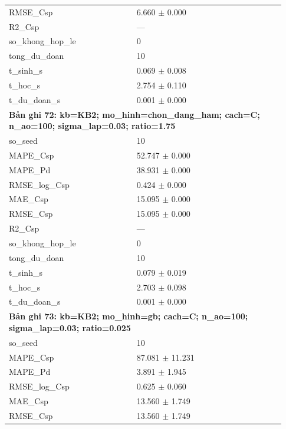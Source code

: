 \begin{longtable}{p{0.43\linewidth}p{0.50\linewidth}}
RMSE\_\allowbreak Csp & 6.660 $\pm$ 0.000 \\
R2\_\allowbreak Csp & — \\
so\_\allowbreak khong\_\allowbreak hop\_\allowbreak le & 0 \\
tong\_\allowbreak du\_\allowbreak doan & 10 \\
t\_\allowbreak sinh\_\allowbreak s & 0.069 $\pm$ 0.008 \\
t\_\allowbreak hoc\_\allowbreak s & 2.754 $\pm$ 0.110 \\
t\_\allowbreak du\_\allowbreak doan\_\allowbreak s & 0.001 $\pm$ 0.000 \\
\midrule
\multicolumn{2}{p{0.95\linewidth}}{\textbf{Bản ghi 72: kb=KB2; mo\_hinh=chon\_dang\_ham; cach=C; n\_ao=100; sigma\_lap=0.03; ratio=1.75}} \\
so\_\allowbreak seed & 10 \\
MAPE\_\allowbreak Csp & 52.747 $\pm$ 0.000 \\
MAPE\_\allowbreak Pd & 38.931 $\pm$ 0.000 \\
RMSE\_\allowbreak log\_\allowbreak Csp & 0.424 $\pm$ 0.000 \\
MAE\_\allowbreak Csp & 15.095 $\pm$ 0.000 \\
RMSE\_\allowbreak Csp & 15.095 $\pm$ 0.000 \\
R2\_\allowbreak Csp & — \\
so\_\allowbreak khong\_\allowbreak hop\_\allowbreak le & 0 \\
tong\_\allowbreak du\_\allowbreak doan & 10 \\
t\_\allowbreak sinh\_\allowbreak s & 0.079 $\pm$ 0.019 \\
t\_\allowbreak hoc\_\allowbreak s & 2.703 $\pm$ 0.098 \\
t\_\allowbreak du\_\allowbreak doan\_\allowbreak s & 0.001 $\pm$ 0.000 \\
\midrule
\multicolumn{2}{p{0.95\linewidth}}{\textbf{Bản ghi 73: kb=KB2; mo\_hinh=gb; cach=C; n\_ao=100; sigma\_lap=0.03; ratio=0.025}} \\
so\_\allowbreak seed & 10 \\
MAPE\_\allowbreak Csp & 87.081 $\pm$ 11.231 \\
MAPE\_\allowbreak Pd & 3.891 $\pm$ 1.945 \\
RMSE\_\allowbreak log\_\allowbreak Csp & 0.625 $\pm$ 0.060 \\
MAE\_\allowbreak Csp & 13.560 $\pm$ 1.749 \\
RMSE\_\allowbreak Csp & 13.560 $\pm$ 1.749 \\

\end{longtable}
